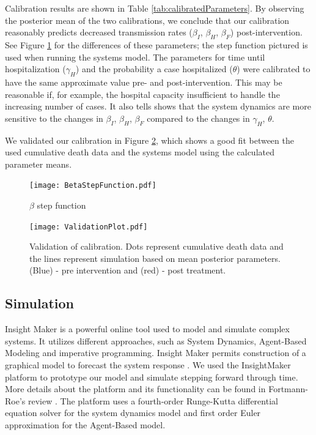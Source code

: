 Calibration results are shown in Table \ref{tab:calibratedParameters}. By observing the posterior mean of the two calibrations, we conclude that our calibration reasonably predicts decreased transmission rates ($\beta_I$, $\beta_H$, $\beta_F$) post-intervention. See Figure \ref{fig:BetaStepFunction} for the differences of these parameters; the step function pictured is used when running the systems model. The parameters for time until hospitalization ($\gamma_H$) and the probability a case hospitalized ($\theta$) were calibrated to have the same approximate value pre- and post-intervention. This may be reasonable if, for example, the hospital capacity  insufficient to handle the increasing number of cases. It also tells shows that the system dynamics are more sensitive to the changes in {$\beta_I$, $\beta_H$, $\beta_F$} compared to the changes in {$\gamma_H$, $\theta$}.


We validated our calibration in Figure \ref{fig:Cumulative _Death}, which shows a good fit between the used cumulative death data and the systems model using the calculated parameter means.


\begin{figure}[!h]
  \centering
  \texttt{[image: BetaStepFunction.pdf]}
  \caption{$\beta$ step function} 
\label{fig:BetaStepFunction} 
\end{figure}


\begin{figure}[h]
  \centering
  \texttt{[image: ValidationPlot.pdf]}
  \caption{Validation of calibration. Dots represent cumulative death data and the lines represent simulation based on mean posterior parameters. (Blue) - pre intervention and (red) - post treatment.}
\label{fig:Cumulative _Death}
\end{figure}




\subsection{Simulation}
 Insight Maker is a powerful online tool used to model and simulate complex systems. It utilizes different approaches, such as System Dynamics, Agent-Based Modeling and imperative programming. Insight Maker permits  construction of a graphical model to forecast the system response \cite{FortmannRoe}. We used the InsightMaker platform to prototype our model and simulate stepping forward through time. More details about the platform and its functionality can be found in Fortmann-Roe's review \cite{FortmannRoe}. The platform uses a fourth-order Runge-Kutta differential equation solver for the system dynamics model and  first order Euler approximation for the Agent-Based model.\\

